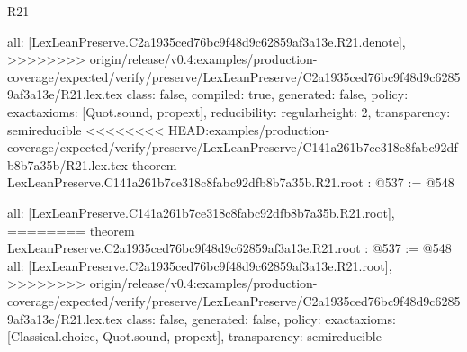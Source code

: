 \begin{lexlean}{R21}
\begin{coremodule}
{{{{{  all: [LexLeanPreserve.C2a1935ced76bc9f48d9c62859af3a13e.R21.denote],
>>>>>>>> origin/release/v0.4:examples/production-coverage/expected/verify/preserve/LexLeanPreserve/C2a1935ced76bc9f48d9c62859af3a13e/R21.lex.tex
  class: false,
  compiled: true,
  generated: false,
  policy: exact{axioms: [Quot.sound, propext]},
  reducibility: regular{height: 2},
  transparency: semireducible
}
<<<<<<<< HEAD:examples/production-coverage/expected/verify/preserve/LexLeanPreserve/C141a261b7ce318c8fabc92dfb8b7a35b/R21.lex.tex
theorem LexLeanPreserve.C141a261b7ce318c8fabc92dfb8b7a35b.R21.root : @537 := @548 {
  all: [LexLeanPreserve.C141a261b7ce318c8fabc92dfb8b7a35b.R21.root],
========
theorem LexLeanPreserve.C2a1935ced76bc9f48d9c62859af3a13e.R21.root : @537 := @548 {
  all: [LexLeanPreserve.C2a1935ced76bc9f48d9c62859af3a13e.R21.root],
>>>>>>>> origin/release/v0.4:examples/production-coverage/expected/verify/preserve/LexLeanPreserve/C2a1935ced76bc9f48d9c62859af3a13e/R21.lex.tex
  class: false,
  generated: false,
  policy: exact{axioms: [Classical.choice, Quot.sound, propext]},
  transparency: semireducible
}

}}}}}
\end{coremodule}
\end{lexlean}
